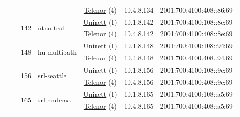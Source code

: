 \begin{small}
\begin{center}
\begin{longtable}{|c|c|c|c|c|c|c|c|}
  &  &  &  & \multicolumn{2}{|c|}{\tiny{\href{https://www.telenor.no}{Telenor} (4)}} & \tiny{10.4.8.134} & \tiny{2001:700:4100:408::86:69} \\* \cline{3-3}\cline{4-4}\cline{5-5}\cline{6-6}\cline{7-7}\cline{8-8}
  &  & \multirow{2}{*}{\tiny{142}} & \multicolumn{1}{|l|}{\multirow{2}{*}{\tiny{ntnu-test}}} & \multicolumn{2}{|c|}{\tiny{\href{https://www.uninett.no}{Uninett} (1)}} & \tiny{10.1.8.142} & \tiny{2001:700:4100:108::8e:69} \\* \cline{5-5}\cline{6-6}\cline{7-7}\cline{8-8}
  &  &  &  & \multicolumn{2}{|c|}{\tiny{\href{https://www.telenor.no}{Telenor} (4)}} & \tiny{10.4.8.142} & \tiny{2001:700:4100:408::8e:69} \\* \cline{3-3}\cline{4-4}\cline{5-5}\cline{6-6}\cline{7-7}\cline{8-8}
  &  & \multirow{2}{*}{\tiny{148}} & \multicolumn{1}{|l|}{\multirow{2}{*}{\tiny{hu-multipath}}} & \multicolumn{2}{|c|}{\tiny{\href{https://www.uninett.no}{Uninett} (1)}} & \tiny{10.1.8.148} & \tiny{2001:700:4100:108::94:69} \\* \cline{5-5}\cline{6-6}\cline{7-7}\cline{8-8}
  &  &  &  & \multicolumn{2}{|c|}{\tiny{\href{https://www.telenor.no}{Telenor} (4)}} & \tiny{10.4.8.148} & \tiny{2001:700:4100:408::94:69} \\* \cline{3-3}\cline{4-4}\cline{5-5}\cline{6-6}\cline{7-7}\cline{8-8}
  &  & \multirow{2}{*}{\tiny{156}} & \multicolumn{1}{|l|}{\multirow{2}{*}{\tiny{srl-seattle}}} & \multicolumn{2}{|c|}{\tiny{\href{https://www.uninett.no}{Uninett} (1)}} & \tiny{10.1.8.156} & \tiny{2001:700:4100:108::9c:69} \\* \cline{5-5}\cline{6-6}\cline{7-7}\cline{8-8}
  &  &  &  & \multicolumn{2}{|c|}{\tiny{\href{https://www.telenor.no}{Telenor} (4)}} & \tiny{10.4.8.156} & \tiny{2001:700:4100:408::9c:69} \\* \cline{3-3}\cline{4-4}\cline{5-5}\cline{6-6}\cline{7-7}\cline{8-8}
  &  & \multirow{2}{*}{\tiny{165}} & \multicolumn{1}{|l|}{\multirow{2}{*}{\tiny{srl-nndemo}}} & \multicolumn{2}{|c|}{\tiny{\href{https://www.uninett.no}{Uninett} (1)}} & \tiny{10.1.8.165} & \tiny{2001:700:4100:108::a5:69} \\* \cline{5-5}\cline{6-6}\cline{7-7}\cline{8-8}
  &  &  &  & \multicolumn{2}{|c|}{\tiny{\href{https://www.telenor.no}{Telenor} (4)}} & \tiny{10.4.8.165} & \tiny{2001:700:4100:408::a5:69} \\ \hline
\end{longtable}
\end{center}
\end{small}



